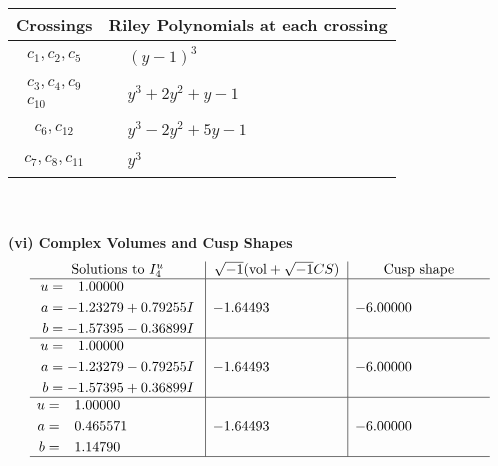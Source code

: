 \documentclass[1p]{elsarticle_modified}
\theoremstyle{definition}
\newcommand{\I}{\sqrt{-1}}
\begin{document}
\begin{tabular}{m{50pt}|m{274pt}}
Crossings & \hspace{64pt}Riley Polynomials at each crossing \\
\hline $$\begin{aligned}c_{1},c_{2},c_{5}\end{aligned}$$&$\begin{aligned}
&(y-1)^3
\end{aligned}$\\
\hline $$\begin{aligned}c_{3},c_{4},c_{9}\\c_{10}\end{aligned}$$&$\begin{aligned}
&y^3+2 y^2+y-1
\end{aligned}$\\
\hline $$\begin{aligned}c_{6},c_{12}\end{aligned}$$&$\begin{aligned}
&y^3-2 y^2+5 y-1
\end{aligned}$\\
\hline $$\begin{aligned}c_{7},c_{8},c_{11}\end{aligned}$$&$\begin{aligned}
&y^3
\end{aligned}$\\
\hline
\end{tabular}\\~\\
\newpage\flushleft \textbf{(vi) Complex Volumes and Cusp Shapes}
$$\begin{array}{c|c|c}  
\text{Solutions to }I^u_{4}& \I (\text{vol} + \sqrt{-1}CS) & \text{Cusp shape}\\
 \hline 
\begin{aligned}
u &= \phantom{-}1.00000\phantom{ +0.000000I} \\
a &= -1.23279 + 0.79255 I \\
b &= -1.57395 - 0.36899 I\end{aligned}
 & -1.64493\phantom{ +0.000000I} & -6.00000\phantom{ +0.000000I} \\ \hline\begin{aligned}
u &= \phantom{-}1.00000\phantom{ +0.000000I} \\
a &= -1.23279 - 0.79255 I \\
b &= -1.57395 + 0.36899 I\end{aligned}
 & -1.64493\phantom{ +0.000000I} & -6.00000\phantom{ +0.000000I} \\ \hline\begin{aligned}
u &= \phantom{-}1.00000\phantom{ +0.000000I} \\
a &= \phantom{-}0.465571\phantom{ +0.000000I} \\
b &= \phantom{-}1.14790\phantom{ +0.000000I}\end{aligned}
 & -1.64493\phantom{ +0.000000I} & -6.00000\phantom{ +0.000000I}\\
 \hline 
 \end{array}$$\newpage\newpage\renewcommand{\arraystretch}{1}
\end{document}
